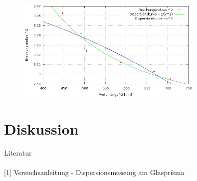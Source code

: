 \begin{figure}[htbp]
\includegraphics[width=0.8\textwidth]{pics/kurve.jpeg}
\end{figure}
\section{Diskussion}




\parskip 50pt
\Large{Literatur}\\\\
\large{[1] Versuchsanleitung - Dispersionsmessung am Glasprisma}\\\\

